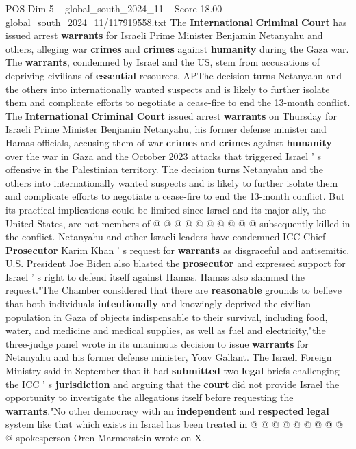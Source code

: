 \begin{textsample}{POS Dim 5 – global\_south\_2024\_11 – Score 18.00 – global\_south\_2024\_11/117919558.txt}  \label{ex:f5_pos_029}
The \textbf{International} \textbf{Criminal} \textbf{Court} has issued arrest \textbf{warrants} for Israeli Prime Minister Benjamin Netanyahu and others, alleging war \textbf{crimes} and \textbf{crimes} against \textbf{humanity} during the Gaza war.
The \textbf{warrants}, condemned by Israel and the US, stem from accusations of depriving civilians of \textbf{essential} resources.
APThe decision turns Netanyahu and the others into internationally wanted suspects and is likely to further isolate them and complicate efforts to negotiate a cease-fire to end the 13-month conflict.
The \textbf{International} \textbf{Criminal} \textbf{Court} issued arrest \textbf{warrants} on Thursday for Israeli Prime Minister Benjamin Netanyahu, his former defense minister and Hamas officials, accusing them of war \textbf{crimes} and \textbf{crimes} against \textbf{humanity} over the war in Gaza and the October 2023 attacks that triggered Israel ' s offensive in the Palestinian territory.
The decision turns Netanyahu and the others into internationally wanted suspects and is likely to further isolate them and complicate efforts to negotiate a cease-fire to end the 13-month conflict.
But its practical implications could be limited since Israel and its major ally, the United States, are not members of @ @ @ @ @ @ @ @ @ @ subsequently killed in the conflict.
Netanyahu and other Israeli leaders have condemned ICC Chief \textbf{Prosecutor} Karim Khan ' s request for \textbf{warrants} as disgraceful and antisemitic.
U.S.
President Joe Biden also blasted the \textbf{prosecutor} and expressed support for Israel ' s right to defend itself against Hamas.
Hamas also slammed the request."The Chamber considered that there are \textbf{reasonable} grounds to believe that both individuals \textbf{intentionally} and knowingly deprived the civilian population in Gaza of objects indispensable to their survival, including food, water, and medicine and medical supplies, as well as fuel and electricity,"the three-judge panel wrote in its unanimous decision to issue \textbf{warrants} for Netanyahu and his former defense minister, Yoav Gallant.
The Israeli Foreign Ministry said in September that it had \textbf{submitted} two \textbf{legal} briefs challenging the ICC ' s \textbf{jurisdiction} and arguing that the \textbf{court} did not provide Israel the opportunity to investigate the allegations itself before requesting the \textbf{warrants}."No other democracy with an \textbf{independent} and \textbf{respected} \textbf{legal} system like that which exists in Israel has been treated in @ @ @ @ @ @ @ @ @ @ spokesperson Oren Marmorstein wrote on X.

\end{textsample}
